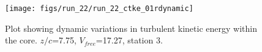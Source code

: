 \begin{figure}[H]
\centering
\texttt{[image: figs/run\_22/run\_22\_ctke\_01rdynamic]}
\caption{Plot showing dynamic variations in turbulent kinetic energy within the core. $z/c$=7.75, $V_{free}$=17.27, station 3.}
\label{fig:run_22_ctke_01rdynamic}
\end{figure}


